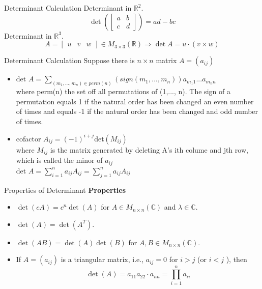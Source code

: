 \documentclass{beamer}
\begin{document}
\begin{frame}{Determinant Calculation}
Determinant in $\mathbb{R}^{2}$.
$$
\operatorname{det}\left(\left[\begin{array}{ll}
a & b \\
c & d
\end{array}\right]\right)=a d-b c
$$
Determinant in $\mathbb{R}^{3}$.
$$
A=\left[\begin{array}{lll}
u & v & w
\end{array}\right] \in M_{3 \times 3}(\mathbb{R}) \Rightarrow \operatorname{det} A=u \cdot(v \times w)
$$    
\end{frame}

\begin{frame}{Determinant Calculation}
    Suppose there is $n\times n$ matrix $A = (a_{ij})$
    \begin{itemize}
        \item det $A = \sum_{(m_1, ..., m_n)\in perm (n)} (sign(m_1, ..., m_n)) a_{m_1 1}...a_{m_n n}$ \\[10pt]
        where perm(n) the set off all permutations of (1,..., n). The sign of a permutation equals 1 if the natural order has been changed an even number of times and equals -1 if the natural order has been changed and odd number of times.
    \end{itemize}
    
    \begin{itemize}
        \item cofactor $A_{ij} = (-1)^{i+j}$det$(M_{ij})$ \\[10pt]
        where $M_{ij}$ is the matrix generated by deleting A's ith colume and jth row, which is called the minor of $a_{ij}$
        \\[10pt]
        det $A = \sum_{i = 1}^n a_{ij}A_{ij} = \sum_{j = 1}^n a_{ij}A_{ij}$
    \end{itemize}
\end{frame}

\begin{frame}{Properties of Determinant}
    \textbf{Properties}
\begin{itemize}
    \item $\operatorname{det}(c A)=c^{n} \operatorname{det}(A)$ for $A \in M_{n \times n}(\mathbb{C})$ and $\lambda \in \mathbb{C}$.
    \item $\operatorname{det}(A)=\operatorname{det}\left(A^{T}\right)$.
    \item $\operatorname{det}(A B)=\operatorname{det}(A) \operatorname{det}(B)$ for $A, B \in M_{n \times n}(\mathbb{C})$.
    \item If $A=\left(a_{ij} \right)$ is a triangular matrix, i.e., $a_{ij} =0$ for $i>j$ (or $i<j$ ), then 
    $$\operatorname{det}(A)=a_{11} a_{22} \cdot a_{n n}=\prod_{i=1}^{n} a_{i i}$$
\end{itemize}
\end{frame}
\end{document}
